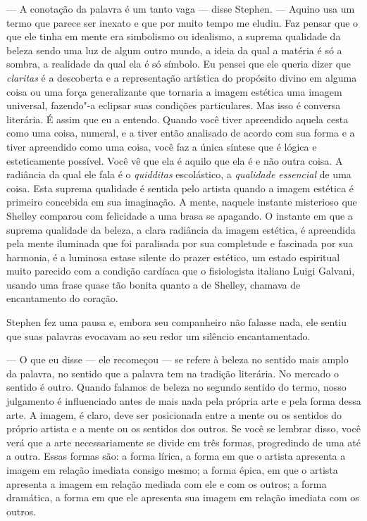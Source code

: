  --- A conotação da palavra é um tanto vaga --- disse Stephen. --- Aquino usa um
termo que parece ser inexato e que por muito tempo me eludiu. Faz
pensar que o que ele tinha em mente era simbolismo ou idealismo, a
suprema qualidade da beleza sendo uma luz de algum outro mundo, a ideia
da qual a matéria é só a sombra, a realidade da qual ela é só símbolo.
Eu pensei que ele queria dizer que \textit{claritas} é a descoberta e a
representação artística do propósito divino em alguma coisa ou uma força
generalizante que tornaria a imagem estética uma imagem universal,
fazendo"-a eclipsar suas condições particulares. Mas isso é conversa
literária. É assim que eu a entendo. Quando você tiver apreendido
aquela cesta como uma coisa, numeral, e a tiver então analisado de
acordo com sua forma e a tiver apreendido como uma coisa, você faz a
única síntese que é lógica e esteticamente possível. Você vê que ela é
aquilo que ela é e não outra coisa. A radiância da qual ele fala é o
\textit{quidditas} escolástico, a \textit{qualidade essencial} de uma
coisa. Esta suprema qualidade é sentida pelo artista quando a imagem
estética é primeiro concebida em sua imaginação. A mente, naquele
instante misterioso que Shelley comparou com felicidade a uma brasa se
apagando. O instante em que a suprema qualidade da beleza, a clara     
radiância da imagem estética, é apreendida pela mente iluminada que foi
paralisada por sua completude e fascinada por sua harmonia, é a
luminosa estase silente do prazer estético, um estado espiritual muito
parecido com a condição cardíaca que o fisiologista italiano Luigi
Galvani, usando uma frase quase tão bonita quanto a de Shelley, chamava
de encantamento do coração.

Stephen fez uma pausa e, embora seu companheiro não falasse nada, ele
sentiu que suas palavras evocavam ao seu redor um silêncio
encantamentado.                                                        

 --- O que eu disse --- ele recomeçou --- se refere à beleza no sentido mais
amplo da palavra, no sentido que a palavra tem na tradição literária.
No mercado o sentido é outro. Quando falamos de beleza no segundo
sentido do termo, nosso julgamento é influenciado antes de mais nada
pela própria arte e pela forma dessa arte. A imagem, é claro, deve ser
posicionada entre a mente ou os sentidos do próprio artista e a mente
ou os sentidos dos outros. Se você se lembrar disso, você verá que a
arte necessariamente se divide em três formas, progredindo de uma até a
outra. Essas formas são: a forma lírica, a forma em que o artista
apresenta a imagem em relação imediata consigo mesmo; a forma épica, em
que o artista apresenta a imagem em relação mediada com ele e com os
outros; a forma dramática, a forma em que ele apresenta sua imagem em
relação imediata com os outros.

